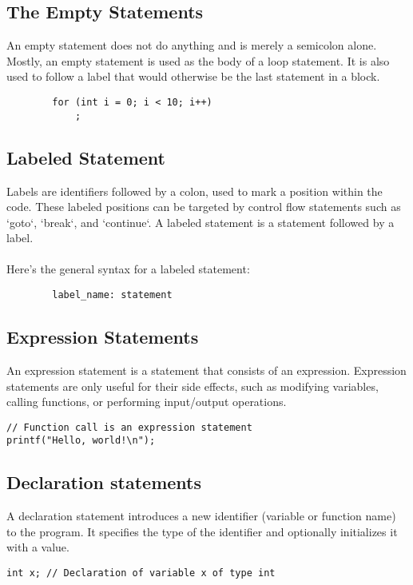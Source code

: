 \documentclass[11pt,A4]{article}
\begin{document}
        \subsection{The Empty Statements}
        An empty statement does not do anything and is merely a semicolon alone. Mostly, an empty statement is used as the body of a loop statement. It is also used to follow a label that would otherwise be the last statement in a block. 
        \begin{lstlisting}
        for (int i = 0; i < 10; i++)
            ;
        \end{lstlisting}
        
        \subsection{Labeled Statement}
        Labels are identifiers followed by a colon, used to mark a position within the code. These labeled positions can be targeted by control flow statements such as `goto`, `break`, and `continue`. A labeled statement is a statement followed by a label.\\ \\
        Here's the general syntax for a labeled statement:
        \begin{lstlisting}
        label_name: statement
        \end{lstlisting}
        
        \subsection{Expression Statements}
        An expression statement is a statement that consists of an expression. Expression statements are only useful for their side effects, such as modifying variables, calling functions, or performing input/output operations.
        \begin{lstlisting}
// Function call is an expression statement
printf("Hello, world!\n");
        \end{lstlisting}

        \subsection{Declaration statements}
        A declaration statement introduces a new identifier (variable or function name) to the program. It specifies the type of the identifier and optionally initializes it with a value.
        \begin{lstlisting}
int x; // Declaration of variable x of type int
        \end{lstlisting}
\end{document}
